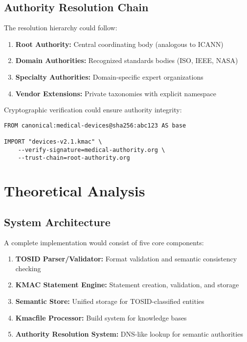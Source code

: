 \documentclass[conference]{IEEEtran}
\begin{document}
\subsection{Authority Resolution Chain}

The resolution hierarchy could follow:

\begin{enumerate}
\item \textbf{Root Authority:} Central coordinating body (analogous to ICANN)
\item \textbf{Domain Authorities:} Recognized standards bodies (ISO, IEEE, NASA)
\item \textbf{Specialty Authorities:} Domain-specific expert organizations
\item \textbf{Vendor Extensions:} Private taxonomies with explicit namespace
\end{enumerate}

Cryptographic verification could ensure authority integrity:

\begin{lstlisting}[caption=Cryptographic Authority Verification]
FROM canonical:medical-devices@sha256:abc123 AS base

IMPORT "devices-v2.1.kmac" \
    --verify-signature=medical-authority.org \
    --trust-chain=root-authority.org
\end{lstlisting}

\section{Theoretical Analysis}

\subsection{System Architecture}

A complete implementation would consist of five core components:

\begin{enumerate}
\item \textbf{TOSID Parser/Validator:} Format validation and semantic consistency checking
\item \textbf{KMAC Statement Engine:} Statement creation, validation, and storage
\item \textbf{Semantic Store:} Unified storage for TOSID-classified entities
\item \textbf{Kmacfile Processor:} Build system for knowledge bases
\item \textbf{Authority Resolution System:} DNS-like lookup for semantic authorities
\end{enumerate}
\end{document}
